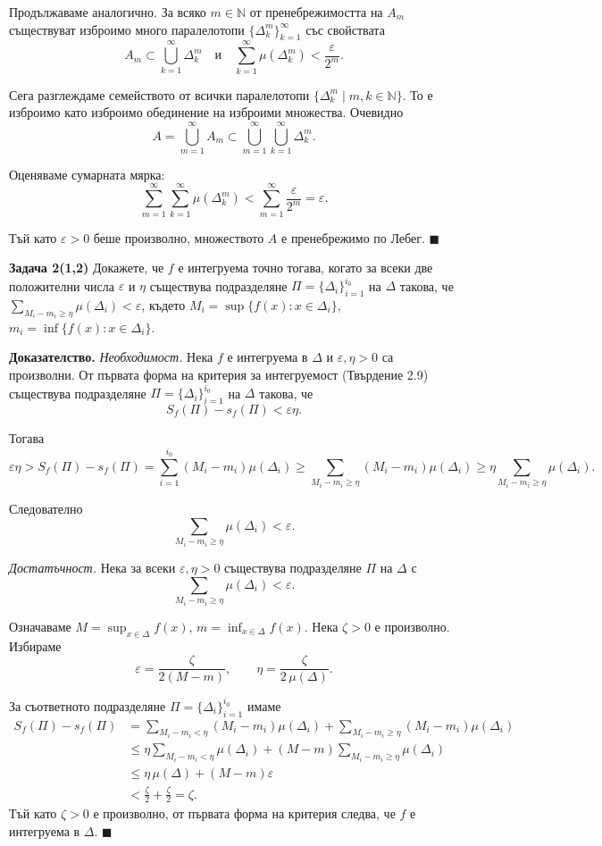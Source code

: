 \documentclass[10pt]{article}
\begin{document}
Продължаваме аналогично. За всяко $m \in \mathbb{N}$ от пренебрежимостта на $A_m$ съществуват изброимо много паралелотопи $\{\Delta_k^m\}_{k=1}^{\infty}$ със свойствата
\[
A_m \subset \bigcup_{k=1}^{\infty} \Delta_k^m \quad \text{и} \quad \sum_{k=1}^{\infty} \mu(\Delta_k^m) < \frac{\varepsilon}{2^m}.
\]

Сега разглеждаме семейството от всички паралелотопи $\{\Delta_k^m \mid m,k \in \mathbb{N}\}$.  
То е изброимо като изброимо обединение на изброими множества. Очевидно
\[
A = \bigcup_{m=1}^{\infty} A_m \subset \bigcup_{m=1}^{\infty} \bigcup_{k=1}^{\infty} \Delta_k^m.
\]

Оценяваме сумарната мярка:
\[
\sum_{m=1}^{\infty} \sum_{k=1}^{\infty} \mu(\Delta_k^m) < \sum_{m=1}^{\infty} \frac{\varepsilon}{2^m} = \varepsilon.
\]

Тъй като $\varepsilon > 0$ беше произволно, множеството $A$ е пренебрежимо по Лебег. $\blacksquare$

\textbf{Задача 2(1,2) }Докажете, че $f$ е интегруема точно тогава, когато за всеки две положителни числа $\varepsilon$ и $\eta$ съществува подразделяне $\Pi = \{\Delta_i\}_{i=1}^{i_0}$ на $\Delta$ такова, че $\displaystyle \sum_{M_i - m_i \ge \eta} \mu(\Delta_i) < \varepsilon$, където $M_i = \sup\{f(x): x\in\Delta_i\}$, $m_i = \inf\{f(x): x\in\Delta_i\}$.

\textbf{Доказателство.}
\textit{Необходимост.} Нека $f$ е интегруема в $\Delta$ и $\varepsilon, \eta > 0$ са произволни.  
От първата форма на критерия за интегруемост (Твърдение 2.9) съществува подразделяне $\Pi = \{\Delta_i\}_{i=1}^{i_0}$ на $\Delta$ такова, че
\[
S_f(\Pi) - s_f(\Pi) < \varepsilon \eta.
\]

Тогава
\[
\varepsilon \eta > S_f(\Pi) - s_f(\Pi) = \sum_{i=1}^{i_0} (M_i - m_i) \mu(\Delta_i) 
\ge \sum_{M_i - m_i \ge \eta} (M_i - m_i) \mu(\Delta_i) 
\ge \eta \sum_{M_i - m_i \ge \eta} \mu(\Delta_i).
\]

Следователно
\[
\sum_{M_i - m_i \ge \eta} \mu(\Delta_i) < \varepsilon.
\]

\noindent
\textit{Достатъчност.} Нека за всеки $\varepsilon, \eta > 0$ съществува подразделяне $\Pi$ на $\Delta$ с
\[
\sum_{M_i - m_i \ge \eta} \mu(\Delta_i) < \varepsilon.
\]

Означаваме $M = \sup_{x \in \Delta} f(x)$, $m = \inf_{x \in \Delta} f(x)$.  
Нека $\zeta > 0$ е произволно. Избираме
\[
\varepsilon = \frac{\zeta}{2(M - m)}, \qquad 
\eta = \frac{\zeta}{2\,\mu(\Delta)}.
\]

За съответното подразделяне $\Pi = \{\Delta_i\}_{i=1}^{i_0}$ имаме
\[
\begin{aligned}
S_f(\Pi) - s_f(\Pi) 
&= \sum_{M_i - m_i < \eta} (M_i - m_i) \mu(\Delta_i) + \sum_{M_i - m_i \ge \eta} (M_i - m_i) \mu(\Delta_i) \\
&\le \eta \sum_{M_i - m_i < \eta} \mu(\Delta_i) + (M - m) \sum_{M_i - m_i \ge \eta} \mu(\Delta_i) \\
&\le \eta \, \mu(\Delta) + (M - m) \varepsilon \\
&< \frac{\zeta}{2} + \frac{\zeta}{2} = \zeta.
\end{aligned}
\]
Тъй като $\zeta > 0$ е произволно, от първата форма на критерия следва, че $f$ е интегруема в $\Delta$. $\blacksquare$
\end{document}
